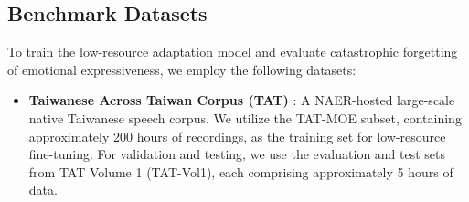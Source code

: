 \subsection{Benchmark Datasets}
To train the low-resource adaptation model and evaluate catastrophic forgetting of emotional expressiveness, we employ the following datasets:
\begin{itemize}
    \item \textbf{Taiwanese Across Taiwan Corpus (TAT)} \citep{Liao2022TATMOE}: A NAER-hosted large-scale native Taiwanese speech corpus. We utilize the TAT-MOE subset, containing approximately 200 hours of recordings, as the training set for low-resource fine-tuning. For validation and testing, we use the evaluation and test sets from TAT Volume 1 (TAT-Vol1), each comprising approximately 5 hours of data.
\end{itemize}
